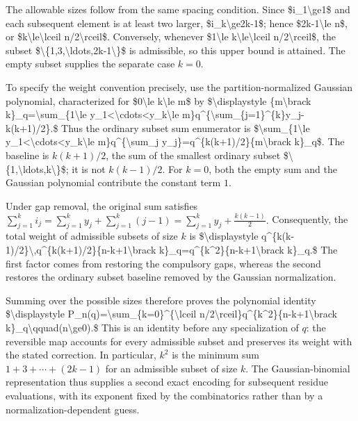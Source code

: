 \documentclass[11pt]{article}
\begin{document}
The allowable sizes follow from the same spacing condition. Since \$i\_1\textbackslash{}ge1\$ and each subsequent element is at least two larger, \$i\_k\textbackslash{}ge2k-1\$; hence \$2k-1\textbackslash{}le n\$, or \$k\textbackslash{}le\textbackslash{}lceil n/2\textbackslash{}rceil\$. Conversely, whenever \$1\textbackslash{}le k\textbackslash{}le\textbackslash{}lceil n/2\textbackslash{}rceil\$, the subset \$\textbackslash{}\{1,3,\textbackslash{}ldots,2k-1\textbackslash{}\}\$ is admissible, so this upper bound is attained. The empty subset supplies the separate case $k=0$.

To specify the weight convention precisely, use the partition-normalized Gaussian polynomial, characterized for \$0\textbackslash{}le k\textbackslash{}le m\$ by
\$\textbackslash{}displaystyle \{m\textbackslash{}brack k\}\_q=\textbackslash{}sum\_\{1\textbackslash{}le y\_1\textless{}\textbackslash{}cdots\textless{}y\_k\textbackslash{}le m\}q\textasciicircum{}\{\textbackslash{}sum\_\{j=1\}\textasciicircum{}\{k\}y\_j-k(k+1)/2\}.\$
Thus the ordinary subset sum enumerator is \$\textbackslash{}sum\_\{1\textbackslash{}le y\_1\textless{}\textbackslash{}cdots\textless{}y\_k\textbackslash{}le m\}q\textasciicircum{}\{\textbackslash{}sum\_j y\_j\}=q\textasciicircum{}\{k(k+1)/2\}\{m\textbackslash{}brack k\}\_q\$. The baseline is $k(k+1)/2$, the sum of the smallest ordinary subset \$\textbackslash{}\{1,\textbackslash{}ldots,k\textbackslash{}\}\$; it is not $k(k-1)/2$. For $k=0$, both the empty sum and the Gaussian polynomial contribute the constant term $1$.

Under gap removal, the original sum satisfies
$\displaystyle \sum_{j=1}^{k}i_j=\sum_{j=1}^{k}y_j+\sum_{j=1}^{k}(j-1)=\sum_{j=1}^{k}y_j+\frac{k(k-1)}2.$
Consequently, the total weight of admissible subsets of size $k$ is
\$\textbackslash{}displaystyle q\textasciicircum{}\{k(k-1)/2\}\textbackslash{},q\textasciicircum{}\{k(k+1)/2\}\{n-k+1\textbackslash{}brack k\}\_q=q\textasciicircum{}\{k\textasciicircum{}2\}\{n-k+1\textbackslash{}brack k\}\_q.\$
The first factor comes from restoring the compulsory gaps, whereas the second restores the ordinary subset baseline removed by the Gaussian normalization.

Summing over the possible sizes therefore proves the polynomial identity
\$\textbackslash{}displaystyle P\_n(q)=\textbackslash{}sum\_\{k=0\}\textasciicircum{}\{\textbackslash{}lceil n/2\textbackslash{}rceil\}q\textasciicircum{}\{k\textasciicircum{}2\}\{n-k+1\textbackslash{}brack k\}\_q\textbackslash{}qquad(n\textbackslash{}ge0).\$
This is an identity before any specialization of $q$: the reversible map accounts for every admissible subset and preserves its weight with the stated correction. In particular, $k^2$ is the minimum sum $1+3+\cdots+(2k-1)$ for an admissible subset of size $k$. The Gaussian-binomial representation thus supplies a second exact encoding for subsequent residue evaluations, with its exponent fixed by the combinatorics rather than by a normalization-dependent guess.
\end{document}
